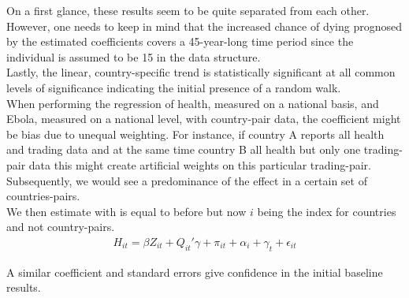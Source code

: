 \documentclass{article}
\begin{document}
On a first glance, these results seem to be quite separated from each other. However, one needs to keep in mind that the increased chance of dying prognosed by the estimated coefficients covers a 45-year-long time period since the individual is assumed to be 15 in the \cite{whostatistics} data structure.\\
Lastly, the linear, country-specific trend is statistically significant at all common levels of significance indicating the initial presence of a random walk. \\
When performing the regression of health, measured on a national basis, and Ebola, measured on a national level, with country-pair data, the coefficient might be bias due to unequal weighting. For instance, if country A reports all health and trading data and at the same time country B all health but only one trading-pair data this might create artificial weights on this particular trading-pair. Subsequently, we would see a predominance of the effect in a certain set of countries-pairs. \\
We then estimate with is equal to before but now $i$ being the index for countries and not country-pairs.
\begin{align}
H_{it} =  \beta Z_{it} +  Q_{it}'\gamma + \pi_{it} + \alpha_i + \gamma_t + \epsilon_{it}
\end{align}

A similar coefficient and standard errors give confidence in the initial baseline results. 
\end{document}
